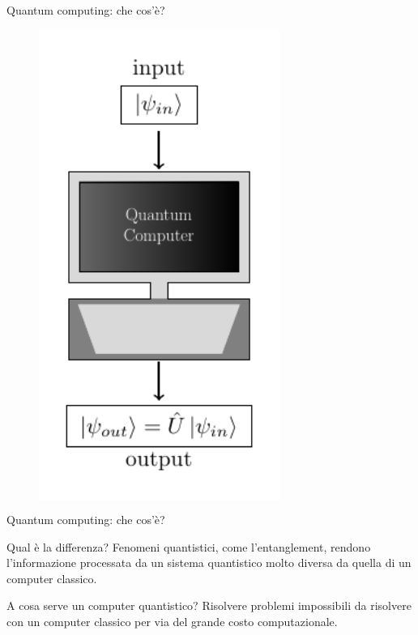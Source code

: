 \documentclass{beamer}
\renewcommand{\'}[0]{\`}
\begin{document}
\begin{frame}{Quantum computing: che cos'è?}
\begin{figure}[h!]
\begin{columns}
	\centering \includegraphics[width=0.7\textwidth]{./tikz/Quantum.pdf}
	\end{columns}
	\end{figure}

	\end{frame}
		
	\begin{frame}{Quantum computing: che cos'è?}
	
	\begin{alertblock}{Qual è la differenza?}
	Fenomeni quantistici, come l'\alert{entanglement}, rendono l'informazione processata da un sistema quantistico molto diversa da quella di un computer classico. \pause	
	\end{alertblock}
	
	\vspace{1cm}
	
	\begin{alertblock}{A cosa serve un computer quantistico?}
	Risolvere problemi impossibili da risolvere con un computer classico per via del grande \alert{costo computazionale}. 
	\end{alertblock}
	
	
	
	
	\end{frame}
\end{document}
